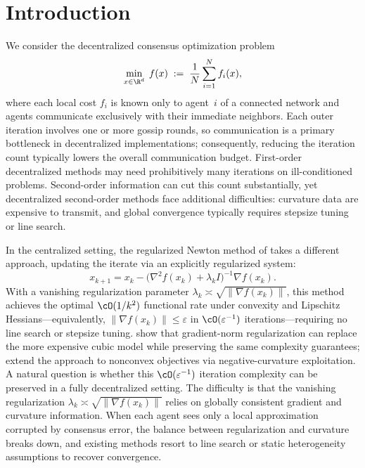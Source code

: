 \documentclass[review,onefignum,onetabnum]{siamart171218}
\begin{document}
	\section{Introduction}\label{sec:intro}
	We consider the decentralized consensus optimization problem
	\begin{equation}\label{eq:intro_prob}
		\min_{x\in\R^d}\; f(x)\;:=\;\frac{1}{N}\sum_{i=1}^N f_i(x),
	\end{equation}
	where each local cost $f_i$ is known only to agent~$i$ of a
	connected network and agents communicate exclusively with their
	immediate neighbors.
	Each outer iteration involves one or more gossip rounds, so communication is a primary bottleneck in decentralized implementations; consequently, reducing the iteration count typically lowers the overall communication budget.
	First-order decentralized methods may need prohibitively many
	iterations on ill-conditioned problems.
	Second-order information can cut this count substantially, yet
	decentralized second-order methods face additional difficulties:
	curvature data are expensive to transmit, and global convergence
	typically requires stepsize tuning or line search.
	
	In the centralized setting, the regularized Newton method of
	\citet{mishchenko2023rn} takes a different approach, updating
	the iterate via an explicitly regularized system:
	\[
	x_{k+1} = x_k - \bigl(\nabla^2 f(x_k) + \lambda_k I\bigr)^{-1} \nabla f(x_k).
	\]
	With a vanishing regularization parameter
	$\lambda_k\asymp\sqrt{\|\nabla f(x_k)\|}$, this method achieves
	the optimal $\cO(1/k^2)$ functional rate under convexity
	and Lipschitz Hessians---equivalently,
	$\|\nabla f(x_k)\|\le\varepsilon$ in $\cO(\varepsilon^{-1})$
	iterations---requiring no line search or stepsize tuning.
	\citet{doikov2024gradient} show that gradient-norm regularization
	can replace the more expensive cubic model
	\citep{nesterov2006cubic,cartis2011arc} while preserving the
	same complexity guarantees;
	\citet{gratton2023nonconvex} extend the approach to nonconvex
	objectives via negative-curvature exploitation.
	A natural question is whether this $\cO(\varepsilon^{-1})$ iteration complexity can be preserved in a fully decentralized setting.
	The difficulty is that the vanishing regularization
	$\lambda_k\asymp\sqrt{\|\nabla f(x_k)\|}$ relies on globally
	consistent gradient and curvature information.
	When each agent sees only a local approximation corrupted
	by consensus error, the balance between regularization and curvature
	breaks down, and existing methods resort to line search or static
	heterogeneity assumptions to recover convergence.
	
\end{document}
